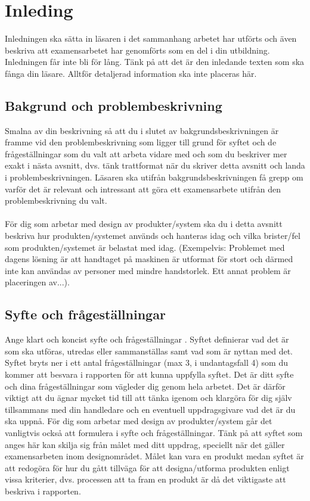 \section{Inleding}
Inledningen ska sätta in läsaren i det sammanhang  arbetet har utförts och även beskriva att examensarbetet har genomförts som en del i din utbildning. Inledningen får inte bli för lång. Tänk på att det är den inledande texten som ska fånga din läsare. Alltför detaljerad information ska inte placeras här.

\subsection{Bakgrund och problembeskrivning}
Smalna av din beskrivning så att du i slutet av bakgrundsbeskrivningen är framme vid den problembeskrivning som ligger till grund för syftet och de frågeställningar som du valt att arbeta vidare med och som du beskriver mer exakt i nästa avsnitt, dvs. tänk trattformat när du skriver detta avsnitt och landa i problembeskrivningen. Läsaren ska utifrån bakgrundsbeskrivningen få grepp om varför det är relevant och intressant att göra ett examensarbete utifrån den problembeskrivning du valt. \\ \\
För dig som arbetar med design av produkter/system ska du i detta avsnitt beskriva hur produkten/systemet används och hanteras idag och vilka brister/fel som produkten/systemet är belastat med idag. (Exempelvis: Problemet med dagens lösning är att handtaget på maskinen är utformat för stort och därmed inte kan användas av personer med mindre handstorlek. Ett annat problem är placeringen av...).

\subsection{Syfte och frågeställningar}
Ange klart och koncist syfte och frågeställningar . Syftet definierar vad det är som ska utföras, utredas eller sammanställas samt vad som är nyttan med det. Syftet bryts ner i ett antal frågeställningar (max 3, i undantagsfall 4) som du kommer att besvara i rapporten för att kunna uppfylla syftet. Det är ditt syfte och dina frågeställningar som vägleder dig genom hela arbetet. Det är därför viktigt att du ägnar mycket tid till att tänka igenom och klargöra för dig själv tillsammans med din handledare och en eventuell uppdragsgivare vad det är du ska uppnå. För dig som arbetar med design av produkter/system går det vanligtvis också att formulera i syfte och frågeställningar. Tänk på att syftet som anges här kan skilja sig från målet med ditt uppdrag, speciellt när det gäller examensarbeten inom designområdet. Målet kan vara en produkt medan syftet är att redogöra för hur du gått tillväga för att designa/utforma produkten enligt vissa kriterier, dvs. processen att ta fram en produkt är då det viktigaste att beskriva i rapporten.

